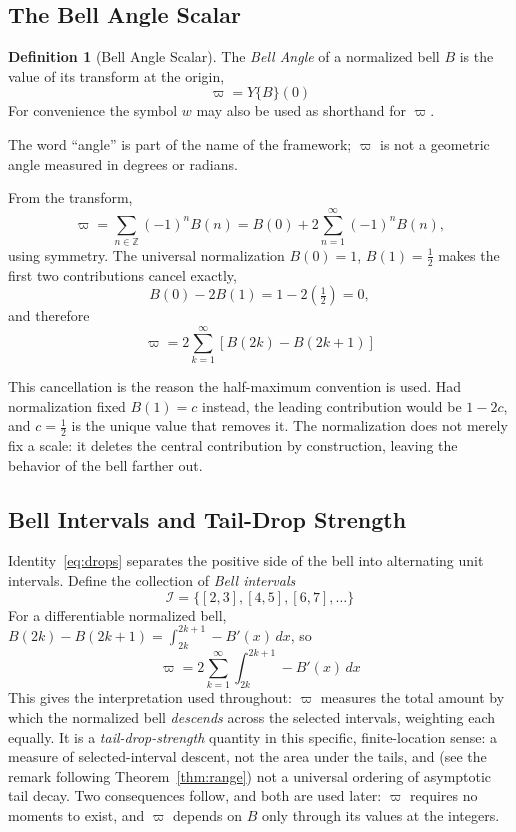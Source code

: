 \documentclass[11pt]{article}
\theoremstyle{definition}
\newtheorem{definition}{Definition}[section]
\theoremstyle{plain}
\theoremstyle{remark}
\begin{document}
\subsection{The Bell Angle Scalar}

\begin{definition}[Bell Angle Scalar]\label{def:varpi}
The \emph{Bell Angle} of a normalized bell $B$ is the value of its transform at the
origin,
\[
\boxed{\;\varpi=Y\{B\}(0)\;}
\]
For convenience the symbol $w$ may also be used as shorthand for $\varpi$.
\end{definition}

The word ``angle'' is part of the name of the framework; $\varpi$ is not a geometric
angle measured in degrees or radians.

From the transform,
\[
\varpi=\sum_{n\in\mathbb{Z}}(-1)^n B(n)
=B(0)+2\sum_{n=1}^{\infty}(-1)^n B(n),
\]
using symmetry. The universal normalization $B(0)=1$, $B(1)=\tfrac12$ makes the first two
contributions cancel exactly,
\[
B(0)-2B(1)=1-2\left(\tfrac12\right)=0,
\]
and therefore
\begin{equation}\label{eq:drops}
\boxed{\;\varpi=2\sum_{k=1}^{\infty}\left[B(2k)-B(2k+1)\right]\;}
\end{equation}

This cancellation is the reason the half-maximum convention is used. Had normalization
fixed $B(1)=c$ instead, the leading contribution would be $1-2c$, and $c=\tfrac12$ is the
unique value that removes it. The normalization does not merely fix a scale: it deletes
the central contribution by construction, leaving the behavior of the bell farther out.

\subsection{Bell Intervals and Tail-Drop Strength}

Identity~\eqref{eq:drops} separates the positive side of the bell into alternating unit
intervals. Define the collection of \emph{Bell intervals}
\[
\boxed{\;\mathcal{I}=\{[2,3],[4,5],[6,7],\ldots\}\;}
\]
For a differentiable normalized bell,
$B(2k)-B(2k+1)=\int_{2k}^{2k+1}-B'(x)\,dx$, so
\[
\boxed{\;\varpi=2\sum_{k=1}^{\infty}\int_{2k}^{2k+1}-B'(x)\,dx\;}
\]
This gives the interpretation used throughout: $\varpi$ measures the total amount by
which the normalized bell \emph{descends} across the selected intervals, weighting each
equally. It is a \emph{tail-drop-strength} quantity in this specific, finite-location
sense: a measure of selected-interval descent, not the area under the tails, and
(see the remark following Theorem~\ref{thm:range}) not a universal ordering of
asymptotic tail decay. Two consequences follow, and both are used later: $\varpi$
requires no moments to exist, and $\varpi$ depends on $B$ only through its values at
the integers.
\end{document}
